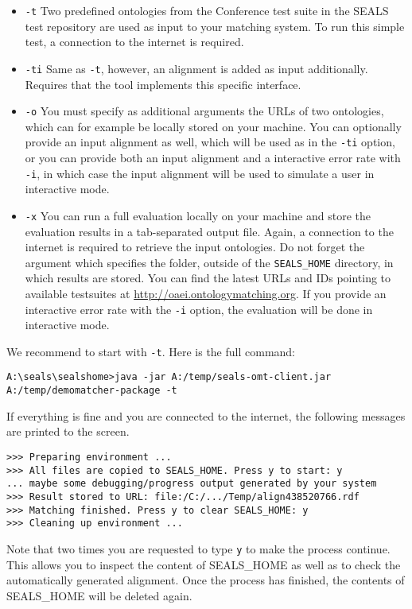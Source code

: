 \documentclass{article}
\begin{document}
\begin{itemize}
	\item \verb|-t| Two predefined ontologies from the Conference test suite in the SEALS test repository are used as input to your matching system. To run this simple test, a connection to the internet is required.
	\item \verb|-ti| Same as \verb|-t|, however, an alignment is added as input additionally. Requires that the tool implements this specific interface.
	\item \verb|-o| You must specify as additional arguments the URLs of two ontologies, which can for example be locally stored on your machine. You can optionally provide an input alignment as well, which will be used as in the \verb|-ti| option, or you can provide both an input alignment and a interactive error rate with \verb|-i|, in which case the input alignment will be used to simulate a user in interactive mode.
	\item \verb|-x| You can run a full evaluation locally on your machine and store the evaluation results in a tab-separated output file. Again, a connection to the internet is required to retrieve the input ontologies. Do not forget the argument which specifies the folder, outside of the \verb|SEALS_HOME| directory, in which results are stored. You can find the latest URLs and IDs pointing to available testsuites at \url{http://oaei.ontologymatching.org}. If you provide an interactive error rate with the \verb|-i| option, the evaluation will be done in interactive mode.
\end{itemize}

We recommend to start with \verb|-t|. Here is the full command:
\begin{verbatim}
A:\seals\sealshome>java -jar A:/temp/seals-omt-client.jar
A:/temp/demomatcher-package -t
\end{verbatim}
If everything is fine and you are connected to the internet, the following messages are printed to the screen.
\begin{verbatim}
>>> Preparing environment ...
>>> All files are copied to SEALS_HOME. Press y to start: y
... maybe some debugging/progress output generated by your system
>>> Result stored to URL: file:/C:/.../Temp/align438520766.rdf
>>> Matching finished. Press y to clear SEALS_HOME: y
>>> Cleaning up environment ...
\end{verbatim}
Note that two times you are requested to type \verb|y| to make the process continue. This allows you to inspect the content of SEALS\_HOME as well as to check the automatically generated alignment. Once the process has finished, the contents of SEALS\_HOME will be deleted again.
\end{document}
